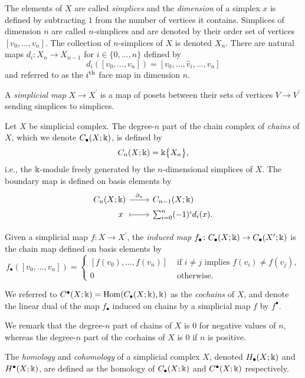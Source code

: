 The elements of $X$ are called \textit{simplices} and the \textit{dimension} of a simplex $x$ is defined by subtracting $1$ from the number of vertices it contains.
Simplices of dimension $n$ are called $n$-simplices and are denoted by their order set of vertices $[v_0, \dots, v_n]$.
The collection of $n$-simplices of $X$ is denoted $X_n$. There are natural maps $d_i \colon X_n \to X_{n-1}$ for $i \in \{0, \dots, n\}$ defined by
\begin{equation*}
d_i([v_0, \dots, v_n]) = [v_0, \dots, \widehat{v}_i, \dots, v_n]
\end{equation*}
and referred to as the $i^{\mathrm{th}}$ face map in dimension $n$.

A \textit{simplicial map} $X \to X^\prime$ is a map of posets between their sets of vertices $V \to V^\prime$ sending simplices to simplices.

Let $X$ be simplicial complex.
The degree-$n$ part of the chain complex of \textit{chains} of $X$, which we denote $C_\bullet(X; \Bbbk)$, is defined by
\begin{equation*}
C_n(X; \Bbbk) = \Bbbk \big\{ X_n \big\},
\end{equation*}
i.e., the $\Bbbk$-module freely generated by the $n$-dimensional simplices of $X$.
The boundary map is defined on basis elements by
\begin{equation*}
\begin{tikzcd}[column sep=normal, row sep=tiny,row sep = 0ex
,/tikz/column 1/.append style={anchor=base east}
,/tikz/column 2/.append style={anchor=base west}
]
C_n(X; \k) \arrow[r, "\partial_n"] & C_{n-1}(X; \k) \\
x\ \arrow[r, |->] & \sum_{i=0}^{n} (-1)^i d_i (x).
\end{tikzcd}
\end{equation*}

Given a simplicial map $f \colon X \to X^\prime$, the \textit{induced map} $f_\bullet \colon C_\bullet(X; \Bbbk) \to C_\bullet(X^\prime; \Bbbk)$ is the chain map defined on basis elements by
\begin{equation*}
f_\bullet([v_0, \dots, v_n]) =
\begin{cases}
[f(v_0), \dots, f(v_n)] & \text{ if } i \neq j \text{ implies } f(v_i) \neq f(v_j), \\
0 & \text{ otherwise}.
\end{cases}
\end{equation*}

We referred to $C^\bullet(X; \Bbbk) = \mathrm{Hom}(C_\bullet(X; \Bbbk), \Bbbk)$ as the \textit{cochains} of $X$, and denote the linear dual of the map $f_\bullet$ induced on chains by a simplicial map $f$ by $f^\bullet$.

We remark that the degree-$n$ part of chains of $X$ is $0$ for negative values of $n$, whereas the degree-$n$ part of the cochains of $X$ is $0$ if $n$ is positive.

The \textit{homology} and \textit{cohomology} of a simplicial complex $X$, denoted $H_\bullet(X; \Bbbk)$ and $H^\bullet(X; \Bbbk)$, are defined as the homology of $C_\bullet(X; \Bbbk)$ and $C^\bullet(X; \Bbbk)$ respectively.